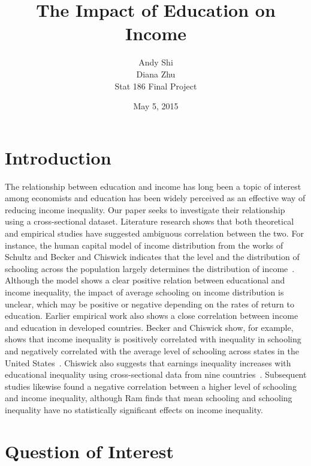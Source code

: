 \documentclass[letterpaper,11pt]{article}
\begin{document}
\title{The Impact of Education on Income}
\author{Andy Shi \\
 Diana Zhu \\[2ex] Stat 186 Final Project}
\date{May 5, 2015}
\maketitle
 


\section{Introduction}

The relationship between education and income has long been a topic of interest
among economists and education has been widely perceived as an effective way of
reducing income inequality. Our paper seeks to investigate their relationship
using a cross-sectional dataset. Literature research shows that both theoretical
and empirical studies have suggested ambiguous correlation between the two. For
instance, the human capital model of income distribution from the works of
Schultz and Becker and Chiswick indicates that the level and the distribution of
schooling across the population largely determines the distribution of
income~\cite{schultz1961,becker1966}. Although the model shows a clear positive
relation between educational and income inequality, the impact of average
schooling on income distribution is unclear, which may be positive or negative
depending on the rates of return to education. Earlier empirical work also shows
a close correlation between income and education in developed countries. Becker
and Chiswick show, for example, shows that income inequality is positively
correlated with inequality in schooling and negatively correlated with the
average level of schooling across states in the United States~\cite{becker1966}.
Chiswick also suggests that earnings inequality increases with educational
inequality using cross-sectional data from nine countries~\cite{chiswick1971}.
Subsequent studies likewise found a negative correlation between a higher level
of schooling and income inequality, although Ram finds that mean schooling and
schooling inequality have no statistically significant effects on income
inequality.


\section{Question of Interest}
\end{document}
